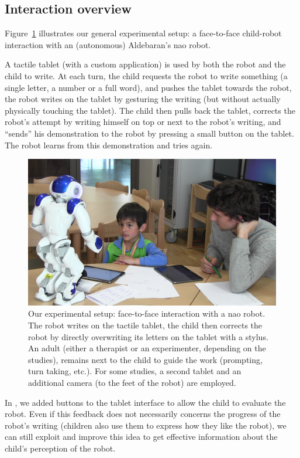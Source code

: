 \documentclass[10pt,a4paper]{article}
\begin{document}
\subsection{Interaction overview}
Figure~\ref{experimental_setup} illustrates our general experimental setup: a
face-to-face child-robot interaction with an (autonomous) Aldebaran's {\sc nao}
robot.

A tactile tablet (with a custom application) is used by both the robot and the
child to write. At each turn, the child requests the robot to write
something (a single letter, a number or a full word), and pushes the tablet
towards the robot, the robot writes on the tablet by gesturing the writing (but
without actually physically touching the tablet). The child then pulls back the
tablet, corrects the robot's attempt by writing himself on top or next to
the robot's writing, and ``sends'' his
demonstration to the robot by pressing a small button on the tablet. The robot
learns from this demonstration and tries again.


   \begin{figure}
       \centering
       \includegraphics[width=0.6\columnwidth]{realSetup}
       \caption{\small Our experimental setup: face-to-face interaction with a {\sc
           nao} robot.  The robot writes on the tactile tablet, the child then
           corrects the robot by directly overwriting its letters on the tablet
           with a stylus. An adult (either a therapist or an experimenter,
           depending on the studies), remains next to the child to guide the work
           (prompting, turn taking, etc.). For some studies, a second tablet and an
           additional camera (to the feet of the robot) are employed.}

       \label{experimental_setup}
   \end{figure}
   
In \cite{jacq2016building}, we added buttons to the tablet interface to allow the child to evaluate the robot. Even if this feedback does not necessarily concerns the progress of the robot's writing (children also use them to express how they like the robot), we can still exploit and improve this idea to get effective information about the child's perception of the robot.
   
\end{document}
